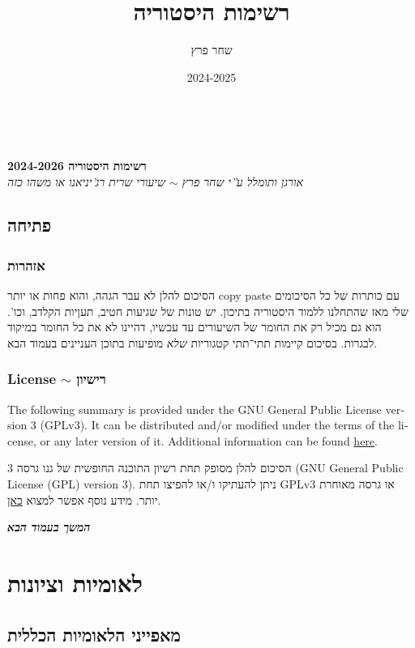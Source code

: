 \documentclass[a4paper]{book}
\author{שחר פרץ}
\title{רשימות היסטוריה}
\date{2024-2025}
\newcommand\npchapter[1] {\npage\chapter{#1}\thispagestyle{empty}\newpage}
\newcommand\name{רשימות היסטוריה 2024-2026}
\newcommand\en[1] {\begin{otherlanguage}{english}#1\end{otherlanguage}}
\newcommand\npage {\vfil {\hfil \textbf{\textit{המשך בעמוד הבא}}} \hfil \vfil \pagebreak}
\begin{document}
	
	\renewcommand{\footrule}{\rule{\linewidth-19pt}{0.25pt}\vspace{-5pt}}
	\thispagestyle{empty}
	\,\! %
	
	{\vspace{0.5\textheight-2em} 
		{
			\begin{center} 
				{
					\textbf{{\name}
					} \\ 
					\textit{אורגן ותומלל ע''י שחר פרץ $\sim$ שיעורי שרית רג'יניאנו או משהו כזה}}
			\end{center}
		}
	}
	
	\newpage
	
	\section{פתיחה}
	\subsection{אזהרות}
	
	הסיכום להלן לא עבר הגהה, והוא פחות או יותר copy paste עם כותרות של כל הסיכומים שלי מאז שהתחלנו ללמוד היסטוריה בתיכון. יש טונות של שגיעות חטיב, תעןיות הקלדב, וכו'. הוא גם מכיל רק את החומר של השיעורים עד עכשיו, דהיינו לא את כל החומר במיקוד לבגרות. בסיכום קיימות תתי־תתי קטגוריות \textit{שלא} מופיעות בתוכן העניינים בעמוד הבא. 
	
	\subsection[רישיון]{License $\sim$ רישיון}
	\en{The following summary is provided under the GNU General Public License version 3 (GPLv3). It can be distributed and/or modified under the terms of the license, or any later version of it. Additional information can be found \href{https://www.gnu.org/licenses}{here}. }
	
	הסיכום להלן מסופק תחת רשיון התוכנה החופשית של גנו גרסה 3 (GNU General Public License (GPL) version 3). ניתן להעתיקו ו/או להפיצו תחת GPLv3 או גרסה מאוחרת יותר. מידע נוסף אפשר למצוא \href{https://www.gnu.org/licenses}{כאן}. 
	
	\newpage
	
	\thispagestyle{empty}
	\tableofcontents
	\thispagestyle{empty}
	
	\newpage
	
	\npchapter{לאומיות וציונות}
	
	\section{מאפייני הלאומיות הכללית}
\end{document}
